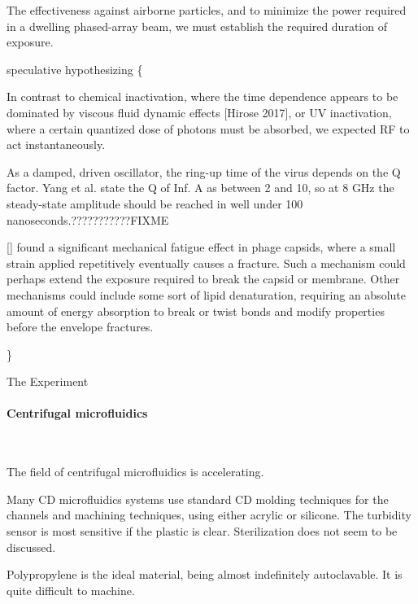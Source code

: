 \documentclass[fleqn,10pt]{article}
\begin{document}
The effectiveness against airborne particles, and to minimize the power required in a dwelling phased-array beam, we must establish the required duration of exposure.

{\color{red} speculative hypothesizing \{ } 

In contrast to chemical inactivation, where the time dependence appears to be dominated by viscous fluid dynamic effects [Hirose 2017], or UV inactivation, where a certain quantized dose of photons must be absorbed, we expected RF to act instantaneously.

As a damped, driven oscillator, the ring-up time of the virus depends on the Q factor. Yang et al. state the Q of Inf. A as between 2 and 10, so at 8 GHz the steady-state amplitude should be reached in well under 100 nanoseconds.???????????FIXME

[] found a significant mechanical fatigue effect in phage capsids, where a small strain applied repetitively eventually causes a fracture. Such a mechanism could perhaps extend the exposure required to break the capsid or membrane. Other mechanisms could include some sort of lipid denaturation, requiring an absolute amount of energy absorption to break or twist bonds and modify properties before the envelope fractures.


{\color{red}  \} } 















\clearpage
\begin{multicols}{1}
{\Large The Experiment}\\

\paragraph{\textbf{Centrifugal microfluidics}}\

The field of centrifugal microfluidics is accelerating. 

Many CD microfluidics systems use standard CD molding techniques for the channels and machining techniques, using either acrylic or silicone. The turbidity sensor is most sensitive if the plastic is clear. Sterilization does not seem to be discussed. 

Polypropylene is the ideal material, being almost indefinitely autoclavable. It is quite difficult to machine.

\end{multicols}
\end{document}
